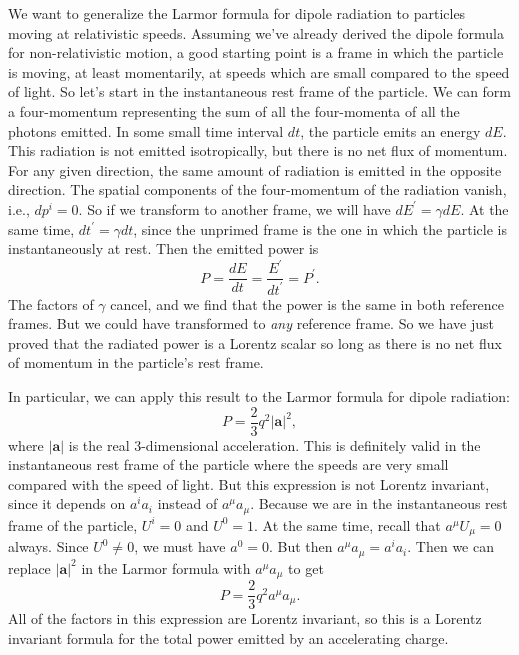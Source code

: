 \documentclass{article}
\begin{document}
We want to generalize the Larmor formula for dipole radiation to particles moving at relativistic speeds. Assuming we've already derived the dipole formula for non-relativistic motion, a good starting point is a frame in which the particle is moving, at least momentarily, at speeds which are small compared to the speed of light. So let's start in the instantaneous rest frame of the particle. We can form a four-momentum representing the sum of all the four-momenta of all the photons emitted. In some small time interval $dt$, the particle emits an energy $dE$. This radiation is not emitted isotropically, but there is no net flux of momentum. For any given direction, the same amount of radiation is emitted in the opposite direction. The spatial components of the four-momentum of the radiation vanish, i.e., $dp^i = 0$. So if we transform to another frame, we will have $dE^\prime = \gamma dE$. At the same time, $dt^\prime = \gamma dt$, since the unprimed frame is the one in which the particle is instantaneously at rest. Then the emitted power is \begin{equation} P = \frac{dE}{dt} = \frac{E^\prime}{dt^\prime} = P^\prime . \end{equation} The factors of $\gamma$ cancel, and we find that the power is the same in both reference frames. But we could have transformed to \emph{any} reference frame. So we have just proved that the radiated power is a Lorentz scalar so long as there is no net flux of momentum in the particle's rest frame.

In particular, we can apply this result to the Larmor formula for dipole radiation: \begin{equation} P = \frac{2}{3} q^2 |\mathbf{a}|^2 , \end{equation} where $|\mathbf{a}|$ is the real 3-dimensional acceleration. This is definitely valid in the instantaneous rest frame of the particle where the speeds are very small compared with the speed of light. But this expression is not Lorentz invariant, since it depends on $a^i a_i$ instead of $a^\mu a_\mu$. Because we are in the instantaneous rest frame of the particle, $U^i = 0$ and $U^0 = 1$. At the same time, recall that $a^\mu U_\mu = 0$ always. Since $U^0 \not = 0$, we must have $a^0 = 0$. But then $a^\mu a_\mu = a^i a_i$. Then we can replace $|\mathbf{a}|^2$ in the Larmor formula with $a^\mu a_\mu$ to get \begin{equation} P = \frac{2}{3} q^2 a^\mu a_\mu . \end{equation} All of the factors in this expression are Lorentz invariant, so this is a Lorentz invariant formula for the total power emitted by an accelerating charge.
\end{document}
